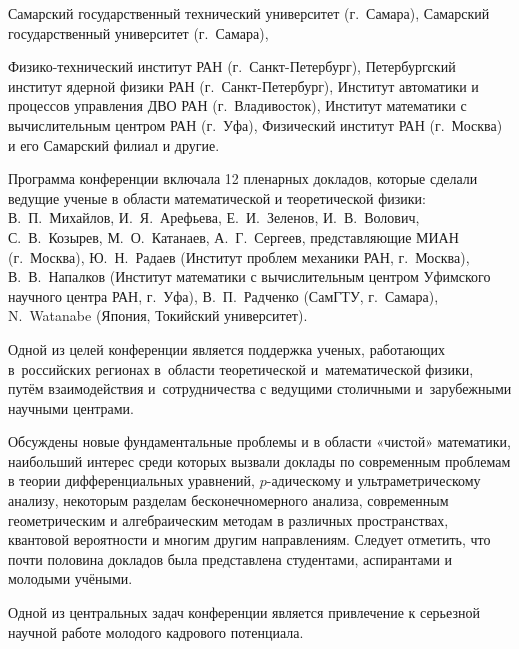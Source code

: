 Самарский государственный технический университет (г.~Самара), Самарский государственный университет (г.~Самара),

Физико-технический институт РАН (г.~Санкт-Петербург), Петербургский институт ядерной физики РАН (г.~Санкт-Петербург), Институт автоматики и процессов управления ДВО РАН (г.~Владивосток), Институт математики с вычислительным центром РАН (г.~Уфа), Физический институт РАН (г.~Москва) и его Самарский филиал и другие.



Программа конференции включала 12 пленарных докладов, которые сделали ведущие ученые в области математической и теоретической физики: В.~П.~Михайлов, И.~Я.~Арефьева, Е.~И.~Зеленов, И.~В.~Волович, С.~В.~Козырев, М.~О.~Катанаев, А.~Г.~Сергеев, представляющие МИАН (г.~Москва), Ю.~Н.~Радаев (Институт проблем механики РАН, г.~Москва), В.~В.~Напалков (Институт математики с вычислительным центром Уфимского научного центра РАН, г.~Уфа), В.~П.~Радченко (СамГТУ, г.~Самара), N.~Watanabe (Япония, Токийский университет). 



Одной из целей конференции является поддержка ученых, работающих в~российских регионах в~области теоретической и~математической физики, путём взаимодействия и~сотрудничества с ведущими столичными и~зарубежными научными центрами.





Обсуждены новые фундаментальные проблемы и в области «чистой» математики, наибольший интерес среди которых вызвали доклады по современным проблемам в теории дифференциальных уравнений, $p$-адическому и ультраметрическому анализу, некоторым разделам бесконечномерного анализа, современным геометрическим и алгебраическим методам в различных пространствах, квантовой вероятности и многим другим направлениям. Следует отметить, что почти половина докладов была представлена студентами, аспирантами и молодыми учёными.



Одной из центральных задач конференции является привлечение к серьезной научной работе молодого кадрового потенциала. 

